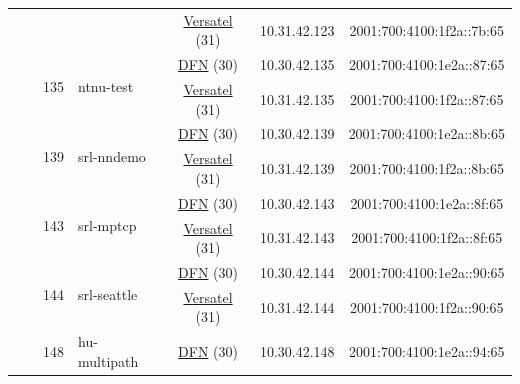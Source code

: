 \begin{small}
\begin{center}
\begin{longtable}{|c|c|c|c|c|c|c|c|}
  &  &  &  & \multicolumn{2}{|c|}{\tiny{\href{http://www.versatel.de}{Versatel} (31)}} & \tiny{10.31.42.123} & \tiny{2001:700:4100:1f2a::7b:65} \\* \cline{3-3}\cline{4-4}\cline{5-5}\cline{6-6}\cline{7-7}\cline{8-8}
  &  & \multirow{2}{*}{\tiny{135}} & \multicolumn{1}{|l|}{\multirow{2}{*}{\tiny{ntnu-test}}} & \multicolumn{2}{|c|}{\tiny{\href{https://www.dfn.de}{DFN} (30)}} & \tiny{10.30.42.135} & \tiny{2001:700:4100:1e2a::87:65} \\* \cline{5-5}\cline{6-6}\cline{7-7}\cline{8-8}
  &  &  &  & \multicolumn{2}{|c|}{\tiny{\href{http://www.versatel.de}{Versatel} (31)}} & \tiny{10.31.42.135} & \tiny{2001:700:4100:1f2a::87:65} \\* \cline{3-3}\cline{4-4}\cline{5-5}\cline{6-6}\cline{7-7}\cline{8-8}
  &  & \multirow{2}{*}{\tiny{139}} & \multicolumn{1}{|l|}{\multirow{2}{*}{\tiny{srl-nndemo}}} & \multicolumn{2}{|c|}{\tiny{\href{https://www.dfn.de}{DFN} (30)}} & \tiny{10.30.42.139} & \tiny{2001:700:4100:1e2a::8b:65} \\* \cline{5-5}\cline{6-6}\cline{7-7}\cline{8-8}
  &  &  &  & \multicolumn{2}{|c|}{\tiny{\href{http://www.versatel.de}{Versatel} (31)}} & \tiny{10.31.42.139} & \tiny{2001:700:4100:1f2a::8b:65} \\* \cline{3-3}\cline{4-4}\cline{5-5}\cline{6-6}\cline{7-7}\cline{8-8}
  &  & \multirow{2}{*}{\tiny{143}} & \multicolumn{1}{|l|}{\multirow{2}{*}{\tiny{srl-mptcp}}} & \multicolumn{2}{|c|}{\tiny{\href{https://www.dfn.de}{DFN} (30)}} & \tiny{10.30.42.143} & \tiny{2001:700:4100:1e2a::8f:65} \\* \cline{5-5}\cline{6-6}\cline{7-7}\cline{8-8}
  &  &  &  & \multicolumn{2}{|c|}{\tiny{\href{http://www.versatel.de}{Versatel} (31)}} & \tiny{10.31.42.143} & \tiny{2001:700:4100:1f2a::8f:65} \\* \cline{3-3}\cline{4-4}\cline{5-5}\cline{6-6}\cline{7-7}\cline{8-8}
  &  & \multirow{2}{*}{\tiny{144}} & \multicolumn{1}{|l|}{\multirow{2}{*}{\tiny{srl-seattle}}} & \multicolumn{2}{|c|}{\tiny{\href{https://www.dfn.de}{DFN} (30)}} & \tiny{10.30.42.144} & \tiny{2001:700:4100:1e2a::90:65} \\* \cline{5-5}\cline{6-6}\cline{7-7}\cline{8-8}
  &  &  &  & \multicolumn{2}{|c|}{\tiny{\href{http://www.versatel.de}{Versatel} (31)}} & \tiny{10.31.42.144} & \tiny{2001:700:4100:1f2a::90:65} \\* \cline{3-3}\cline{4-4}\cline{5-5}\cline{6-6}\cline{7-7}\cline{8-8}
  &  & \multirow{2}{*}{\tiny{148}} & \multicolumn{1}{|l|}{\multirow{2}{*}{\tiny{hu-multipath}}} & \multicolumn{2}{|c|}{\tiny{\href{https://www.dfn.de}{DFN} (30)}} & \tiny{10.30.42.148} & \tiny{2001:700:4100:1e2a::94:65} \\* \cline{5-5}\cline{6-6}\cline{7-7}\cline{8-8}

\end{longtable}
\end{center}
\end{small}

